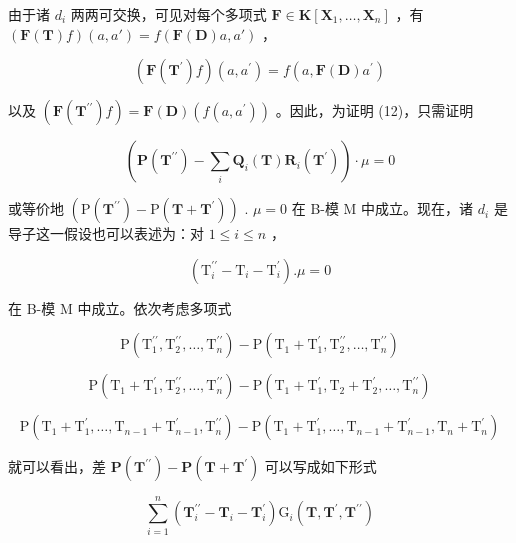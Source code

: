 由于诸 \(d_{i}\) 两两可交换，可见对每个多项式 \(\mathbf{F} \in \mathbf{K}[\mathbf{X}_{1}, \ldots, \mathbf{X}_{n}]\) ，有 \((\mathbf{F}(\mathbf{T})f)(a, a') = f(\mathbf{F}(\mathbf{D})a, a')\) ，

\[
(\mathbf {F} (\mathbf {T} ^ {\prime}) f) (a, a ^ {\prime}) = f (a, \mathbf {F} (\mathbf {D}) a ^ {\prime})
\]

以及 \((\mathbf{F}(\mathbf{T}^{\prime \prime})f) = \mathbf{F}(\mathbf{D})(f(a,a^{\prime}))\) 。因此，为证明 (12)，只需证明

\[
(\mathbf {P} (\mathbf {T} ^ {\prime \prime}) - \sum_ {i} \mathbf {Q} _ {i} (\mathbf {T}) \mathbf {R} _ {i} (\mathbf {T} ^ {\prime})) \cdot \mu = 0\tag{14}
\]

或等价地 \((\mathrm{P}(\mathbf{T}^{\prime\prime}) - \mathrm{P}(\mathbf{T} + \mathbf{T}^{\prime}))\) . \(\mu = 0\) 在 B-模 M 中成立。现在，诸 \(d_{i}\) 是导子这一假设也可以表述为：对 \(1 \leqslant i \leqslant n\) ，

\[
\left(\mathrm{T} _ {i} ^ {\prime \prime} - \mathrm{T} _ {i} - \mathrm{T} _ {i} ^ {\prime}\right). \mu = 0\tag{15}
\]

在 B-模 M 中成立。依次考虑多项式

\[
\mathrm{P} \left(\mathrm{T} _ {1} ^ {\prime \prime}, \mathrm{T} _ {2} ^ {\prime \prime}, \dots , \mathrm{T} _ {n} ^ {\prime \prime}\right) - \mathrm{P} \left(\mathrm{T} _ {1} + \mathrm{T} _ {1} ^ {\prime}, \mathrm{T} _ {2} ^ {\prime \prime}, \dots , \mathrm{T} _ {n} ^ {\prime \prime}\right)
\]

\[
\mathrm{P} \left(\mathrm{T} _ {1} + \mathrm{T} _ {1} ^ {\prime}, \mathrm{T} _ {2} ^ {\prime \prime}, \dots , \mathrm{T} _ {n} ^ {\prime \prime}\right) - \mathrm{P} \left(\mathrm{T} _ {1} + \mathrm{T} _ {1} ^ {\prime}, \mathrm{T} _ {2} + \mathrm{T} _ {2} ^ {\prime}, \dots , \mathrm{T} _ {n} ^ {\prime \prime}\right)
\]

\[
\mathrm{P} \left(\mathrm{T} _ {1} + \mathrm{T} _ {1} ^ {\prime}, \dots , \mathrm{T} _ {n - 1} + \mathrm{T} _ {n - 1} ^ {\prime}, \mathrm{T} _ {n} ^ {\prime \prime}\right) - \mathrm{P} \left(\mathrm{T} _ {1} + \mathrm{T} _ {1} ^ {\prime}, \dots , \mathrm{T} _ {n - 1} + \mathrm{T} _ {n - 1} ^ {\prime}, \mathrm{T} _ {n} + \mathrm{T} _ {n} ^ {\prime}\right)
\]

就可以看出，差 \(\mathbf{P}(\mathbf{T}^{\prime \prime}) - \mathbf{P}(\mathbf{T} + \mathbf{T}^{\prime})\) 可以写成如下形式

\[
\sum_ {i = 1} ^ {n} \left(\mathbf {T} _ {i} ^ {\prime \prime} - \mathbf {T} _ {i} - \mathbf {T} _ {i} ^ {\prime}\right) \mathrm{G} _ {i} (\mathbf {T}, \mathbf {T} ^ {\prime}, \mathbf {T} ^ {\prime \prime})
\]

